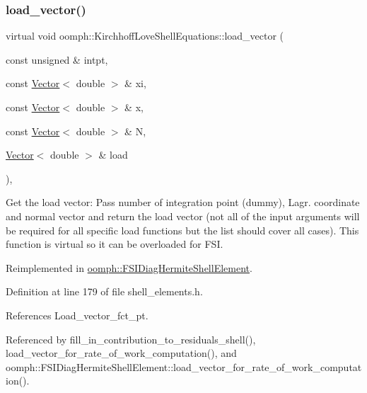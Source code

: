 \subsubsection{\texorpdfstring{load\+\_\+vector()}{load\_vector()}}
{\footnotesize\ttfamily virtual void oomph\+::\+Kirchhoff\+Love\+Shell\+Equations\+::load\+\_\+vector (\begin{DoxyParamCaption}\item[{const unsigned \&}]{intpt,  }\item[{const \hyperlink{classoomph_1_1Vector}{Vector}$<$ double $>$ \&}]{xi,  }\item[{const \hyperlink{classoomph_1_1Vector}{Vector}$<$ double $>$ \&}]{x,  }\item[{const \hyperlink{classoomph_1_1Vector}{Vector}$<$ double $>$ \&}]{N,  }\item[{\hyperlink{classoomph_1_1Vector}{Vector}$<$ double $>$ \&}]{load }\end{DoxyParamCaption})\hspace{0.3cm}{\ttfamily [inline]}, {\ttfamily [virtual]}}



Get the load vector\+: Pass number of integration point (dummy), Lagr. coordinate and normal vector and return the load vector (not all of the input arguments will be required for all specific load functions but the list should cover all cases). This function is virtual so it can be overloaded for F\+SI. 



Reimplemented in \hyperlink{classoomph_1_1FSIDiagHermiteShellElement_a1ef92a7c7157b252fdfc624ab5bc6165}{oomph\+::\+F\+S\+I\+Diag\+Hermite\+Shell\+Element}.



Definition at line 179 of file shell\+\_\+elements.\+h.



References Load\+\_\+vector\+\_\+fct\+\_\+pt.



Referenced by fill\+\_\+in\+\_\+contribution\+\_\+to\+\_\+residuals\+\_\+shell(), load\+\_\+vector\+\_\+for\+\_\+rate\+\_\+of\+\_\+work\+\_\+computation(), and oomph\+::\+F\+S\+I\+Diag\+Hermite\+Shell\+Element\+::load\+\_\+vector\+\_\+for\+\_\+rate\+\_\+of\+\_\+work\+\_\+computation().

\mbox{\label{classoomph_1_1KirchhoffLoveShellEquations_ae565dc5fcdf60d733f6d19361e88d22d}} 
